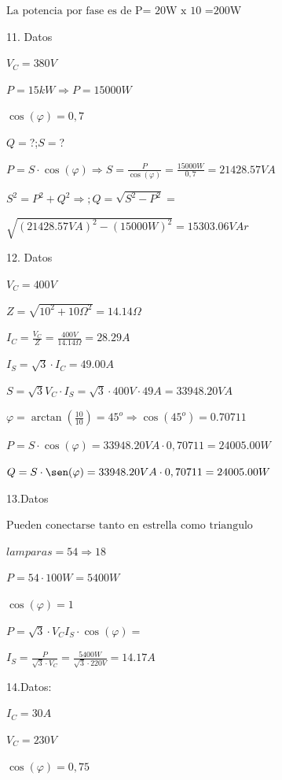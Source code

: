 \documentclass[../main]{subfiles}
\begin{document}
$\text{La potencia por fase es de P= 20W x 10 =200W}$

\vspace{1cm}

11. Datos

$V_C=380V$

$P=15kW\Rightarrow P=15000W$

$\cos(\varphi)=0,7$

$Q=$?;$S=$?

$P=S\cdot \cos(\varphi)\Rightarrow
S=\frac{P}{\cos(\varphi)}=\frac{15000W}{0,7}=21428.57VA$

$S^2=P^2+Q^2\Rightarrow ; Q=\sqrt{S^2-P^2}=$

$\sqrt{{(21428.57VA)}^2-{(15000W)}^2}=15303.06VAr$

\vspace{1cm}

12. Datos

$V_C=400V$

$Z=\sqrt{10^2+10\Omega^2}=14.14 \Omega$

$I_C=\frac{V_C}{Z}=\frac{400V}{14.14\Omega}=28.29A$

$I_S=\sqrt{3}\cdot I_C=49.00A$

$S=\sqrt{3} V_C\cdot I_S=\sqrt{3}\cdot 400V\cdot 49A = 33948.20VA$

$\varphi=\arctan(\frac{10}{10})= 45^o\Rightarrow \cos(45^o)=0.70711$

$P=S \cdot \cos(\varphi)=33948.20VA \cdot 0,70711=24005.00W$

$Q=S\cdot \sen(\varphi)=33948.20VA \cdot 0,70711=24005.00W$

\vspace{1cm}

13.Datos

$\text{Pueden conectarse tanto en estrella como triangulo}$

$lamparas =54 \Rightarrow 18$

$P=54\cdot100W=5400W$

$\cos(\varphi)=1$

$P=\sqrt{3} \cdot V_C I_S \cdot \cos(\varphi)=$

$I_S=\frac{P}{\sqrt{3}\cdot V_C}=\frac{5400W}{\sqrt{3}\cdot 220V}=14.17A$

\vspace{1cm}

14.Datos:

$I_C=30A$

$V_C=230V$

$\cos(\varphi)=0,75$
\end{document}
